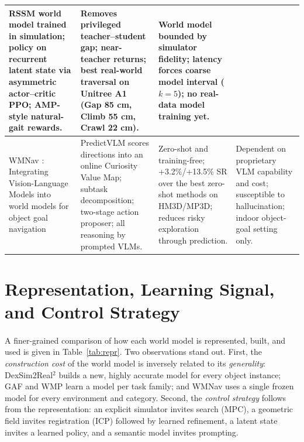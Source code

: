\documentclass[12pt,a4paper,final]{extreport}
\begin{document}
{\begin{longtable}{|p{3.3cm}|p{3.55cm}|p{3.55cm}|p{3.55cm}|}
RSSM world model trained in simulation; policy on recurrent latent state via asymmetric actor--critic PPO; AMP-style natural-gait rewards. &
Removes privileged teacher--student gap; near-teacher returns; best real-world traversal on Unitree A1 (Gap 85 cm, Climb 55 cm, Crawl 22 cm). &
World model bounded by simulator fidelity; latency forces coarse model interval ($k=5$); no real-data model training yet. \\
\hline
WMNav \cite{p4}: Integrating Vision-Language Models into world models for object goal navigation &
PredictVLM scores directions into an online Curiosity Value Map; subtask decomposition; two-stage action proposer; all reasoning by prompted VLMs. &
Zero-shot and training-free; +3.2\%/+13.5\% SR over the best zero-shot methods on HM3D/MP3D; reduces risky exploration through prediction. &
Dependent on proprietary VLM capability and cost; susceptible to hallucination; indoor object-goal setting only. \\
\end{longtable}}

\section{Representation, Learning Signal, and Control Strategy}

\paragraph{} A finer-grained comparison of how each world model is represented, built, and used is given in Table~\ref{tab:repr}. Two observations stand out. First, the \emph{construction cost} of the world model is inversely related to its \emph{generality}: DexSim2Real$^2$ builds a new, highly accurate model for every object instance; GAF and WMP learn a model per task family; and WMNav uses a single frozen model for every environment and category. Second, the \emph{control strategy} follows from the representation: an explicit simulator invites search (MPC), a geometric field invites registration (ICP) followed by learned refinement, a latent state invites a learned policy, and a semantic model invites prompting.
\end{document}
